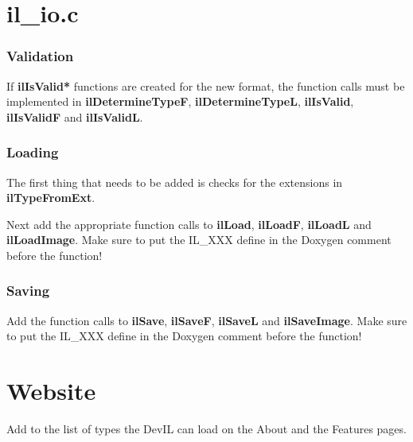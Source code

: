 \documentclass[letterpaper,10pt]{article}
\begin{document}
\section*{il\_io.c}

\subsubsection*{Validation}
If \textbf{ilIsValid*} functions are created for the new format, the function calls must be implemented in \textbf{ilDetermineTypeF}, \textbf{ilDetermineTypeL}, \textbf{ilIsValid}, \textbf{ilIsValidF} and \textbf{ilIsValidL}.

\subsubsection*{Loading}
The first thing that needs to be added is checks for the extensions in \textbf{ilTypeFromExt}.

Next add the appropriate function calls to \textbf{ilLoad}, \textbf{ilLoadF}, \textbf{ilLoadL} and \textbf{ilLoadImage}.  Make sure to put the IL\_XXX define in the Doxygen comment before the function!

\subsubsection*{Saving}
Add the function calls to \textbf{ilSave}, \textbf{ilSaveF}, \textbf{ilSaveL} and \textbf{ilSaveImage}.  Make sure to put the IL\_XXX define in the Doxygen comment before the function!


\section*{Website}
Add to the list of types the DevIL can load on the About and the Features pages.
\end{document}
